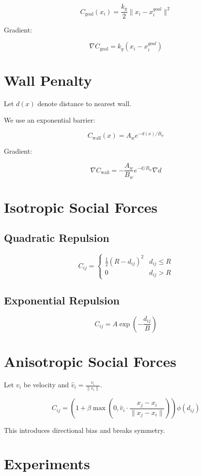 \documentclass[11pt]{article}
\begin{document}
\[
C_{\text{goal}}(x_i)
=
\frac{k_g}{2} \|x_i - x_i^{goal}\|^2
\]

Gradient:

\[
\nabla C_{\text{goal}} = k_g (x_i - x_i^{goal})
\]

\section{Wall Penalty}

Let $d(x)$ denote distance to nearest wall.

We use an exponential barrier:

\[
C_{\text{wall}}(x)
=
A_w e^{-d(x)/B_w}
\]

Gradient:

\[
\nabla C_{\text{wall}} =
- \frac{A_w}{B_w}
e^{-d/B_w} \nabla d
\]

\section{Isotropic Social Forces}

\subsection{Quadratic Repulsion}

\[
C_{ij}
=
\begin{cases}
\frac{1}{2}(R - d_{ij})^2 & d_{ij} \le R \\
0 & d_{ij} > R
\end{cases}
\]

\subsection{Exponential Repulsion}

\[
C_{ij} = A \exp\left(-\frac{d_{ij}}{B}\right)
\]

\section{Anisotropic Social Forces}

Let $v_i$ be velocity and $\hat v_i = \frac{v_i}{\|v_i\|}$.

\[
C_{ij}
=
\left(
1 + \beta \max\left(0,
\hat v_i \cdot
\frac{x_j - x_i}{\|x_j - x_i\|}
\right)
\right)
\phi(d_{ij})
\]

This introduces directional bias and breaks symmetry.

\section{Experiments}
\end{document}

